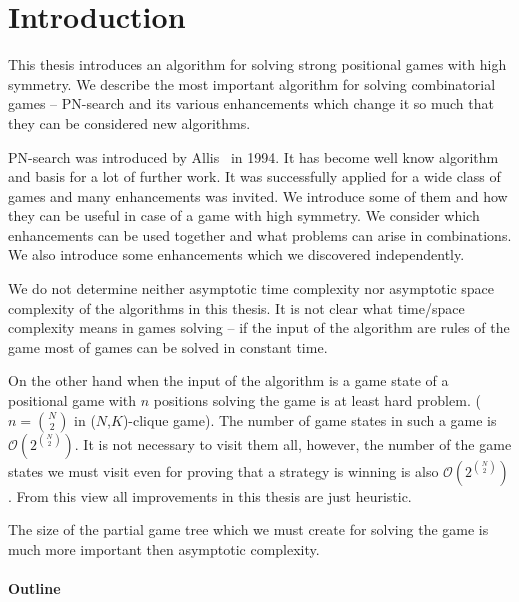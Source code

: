 \chapter*{Introduction}

This thesis introduces an algorithm for solving strong positional games
with high symmetry. We describe the most important algorithm for solving 
combinatorial games -- PN-search and its various enhancements which change
it so much that they can be considered new algorithms. 

%

\medskip

PN-search was introduced by Allis~\cite{allis} in 1994. It has become well know algorithm
and basis for a lot of further work. It was successfully applied for a wide class
of games and many enhancements was invited. We introduce some of them and how they can be useful
in case of a game with high symmetry. We consider which  enhancements
can be used together and what problems can arise in combinations.
We also introduce some enhancements which we discovered independently.

\medskip

We do not determine neither asymptotic time complexity nor asymptotic space complexity of the algorithms in this thesis.
It is not clear what time/space complexity means in games solving -- 
if the input of the  algorithm are rules of the game most of games can be solved in constant time.

On the other hand when the input of the algorithm is a game state
of a positional game with $n$ positions solving the game is at least hard problem.
($n = {N \choose 2}$ in ($N$,$K$)-clique game). The number of game states in
such a game is $\mathcal{O}(2^{N \choose 2})$. It is not necessary to visit them all,
however, the number of the game states we must visit even for proving that a strategy
is winning is also $\mathcal{O}(2^{N \choose 2})$. From this view all improvements in this
thesis are just heuristic.

The size of the partial game tree which we must create for solving the game is 
much more important then asymptotic complexity.

\subsubsection{Outline}

